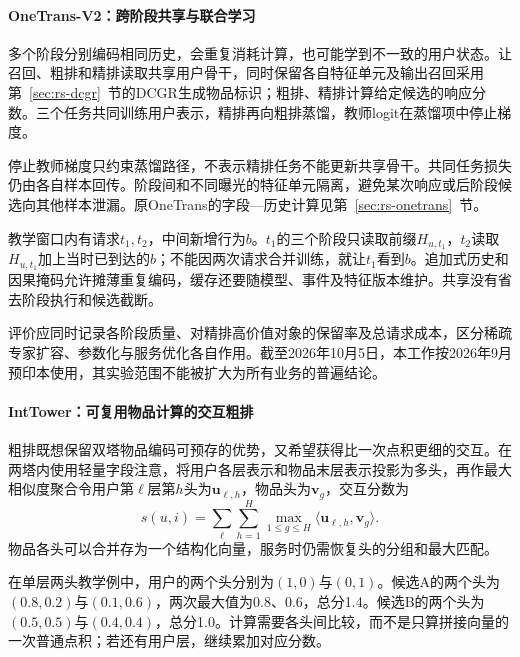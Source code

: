 \paragraph{OneTrans-V2：跨阶段共享与联合学习}
\label{sec:rs-onetrans-v2}

多个阶段分别编码相同历史，会重复消耗计算，也可能学到不一致的用户状态。让召回、粗排和精排读取共享用户骨干，同时保留各自特征单元及输出召回采用第~\ref{sec:rs-dcgr}~节的DCGR生成物品标识；粗排、精排计算给定候选的响应分数。三个任务共同训练用户表示，精排再向粗排蒸馏，教师logit在蒸馏项中停止梯度。

停止教师梯度只约束蒸馏路径，不表示精排任务不能更新共享骨干。共同任务损失仍由各自样本回传。阶段间和不同曝光的特征单元隔离，避免某次响应或后阶段候选向其他样本泄漏。原OneTrans的字段—历史计算见第~\ref{sec:rs-onetrans}~节。

教学窗口内有请求$t_1,t_2$，中间新增行为$b$。$t_1$的三个阶段只读取前缀$H_{u,t_1}$，$t_2$读取$H_{u,t_1}$加上当时已到达的$b$；不能因两次请求合并训练，就让$t_1$看到$b$。追加式历史和因果掩码允许摊薄重复编码，缓存还要随模型、事件及特征版本维护。共享没有省去阶段执行和候选截断。

评价应同时记录各阶段质量、对精排高价值对象的保留率及总请求成本，区分稀疏专家扩容、参数化与服务优化各自作用。截至2026年10月5日，本工作按2026年9月预印本使用，其实验范围不能被扩大为所有业务的普遍结论。

\paragraph{IntTower：可复用物品计算的交互粗排}
\label{sec:rs-inttower}

粗排既想保留双塔物品编码可预存的优势，又希望获得比一次点积更细的交互。在两塔内使用轻量字段注意，将用户各层表示和物品末层表示投影为多头，再作最大相似度聚合令用户第$\ell$层第$h$头为$\bm u_{\ell,h}$，物品头为$\bm v_g$，交互分数为
\begin{equation}
 s(u,i)=\sum_{\ell}\sum_{h=1}^{H}
           \max_{1\leq g\leq H}
               \langle\bm u_{\ell,h},\bm v_g\rangle.
 \label{eq:rs-inttower}
\end{equation}
物品各头可以合并存为一个结构化向量，服务时仍需恢复头的分组和最大匹配。

在单层两头教学例中，用户的两个头分别为$(1,0)$与$(0,1)$。候选A的两个头为$(0.8,0.2)$与$(0.1,0.6)$，两次最大值为0.8、0.6，总分1.4。候选B的两个头为$(0.5,0.5)$与$(0.4,0.4)$，总分1.0。计算需要各头间比较，而不是只算拼接向量的一次普通点积；若还有用户层，继续累加对应分数。

